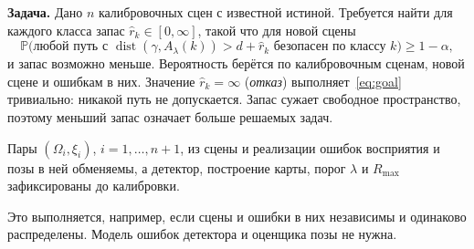 \textbf{Задача.} Дано $n$ калибровочных сцен с известной истиной. Требуется найти для каждого класса запас $\hat r_k \in [0, \infty]$, такой что для новой сцены
\begin{equation}
  \mathbb P\bigl(\text{любой путь с } \operatorname{dist}(\gamma, A_\lambda(k)) > d + \hat r_k \text{ безопасен по классу } k\bigr) \ge 1 - \alpha,
  \label{eq:goal}
\end{equation}
и запас возможно меньше. Вероятность берётся по калибровочным сценам, новой сцене и ошибкам в них. Значение $\hat r_k = \infty$ (\emph{отказ}) выполняет~\eqref{eq:goal} тривиально: никакой путь не допускается. Запас сужает свободное пространство, поэтому меньший запас означает больше решаемых задач.

\begin{assumption}[обменяемость]\label{as:exch}
Пары $(\Omega_i, \xi_i)$, $i = 1, \dots, n + 1$, из сцены и реализации ошибок восприятия и позы в ней обменяемы, а детектор, построение карты, порог $\lambda$ и $R_{\max}$ зафиксированы до калибровки.
\end{assumption}

Это выполняется, например, если сцены и ошибки в них независимы и одинаково распределены. Модель ошибок детектора и оценщика позы не нужна.
